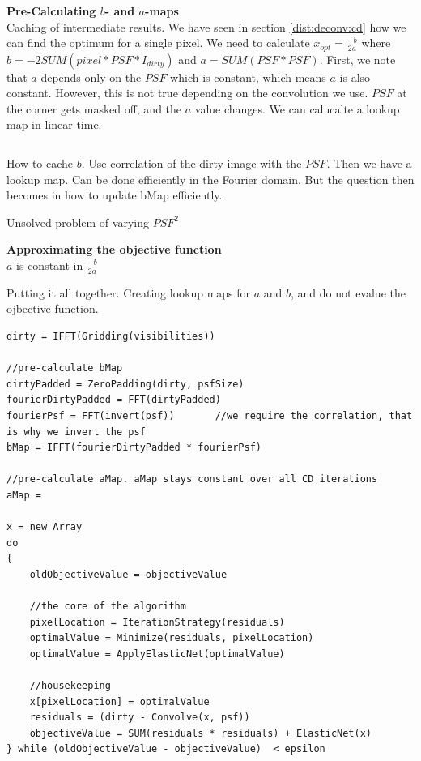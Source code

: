 \textbf{Pre-Calculating $b$- and $a$-maps}\\
Caching of intermediate results. We have seen in section \ref{dist:deconv:cd} how we can find the optimum for a single pixel. We need to calculate  $x_{opt} = \frac{-b}{2a}$ where  $b = -2 SUM( pixel*PSF*I_{dirty})$ and $a = SUM(PSF * PSF)$. First, we note that $a$ depends only on the $PSF$ which is constant, which means $a$ is also constant. However, this is not true depending on the convolution we use.
$PSF$ at the corner gets masked off, and the $a$ value changes.
We can calucalte a lookup map in linear time.
\begin{lstlisting}

\end{lstlisting}

How to cache $b$. Use correlation of the dirty image with the $PSF$. Then we have a lookup map. Can be done efficiently in the Fourier domain. But the question then becomes in how to update bMap efficiently.


Unsolved problem of varying $PSF^2$

\textbf{Approximating the objective function}\\
$a$ is constant in $\frac{-b}{2a}$



Putting it all together. Creating lookup maps for $a$ and $b$, and do not evalue the ojbective function.
\begin{lstlisting}
dirty = IFFT(Gridding(visibilities))

//pre-calculate bMap
dirtyPadded = ZeroPadding(dirty, psfSize)
fourierDirtyPadded = FFT(dirtyPadded)
fourierPsf = FFT(invert(psf))		//we require the correlation, that is why we invert the psf
bMap = IFFT(fourierDirtyPadded * fourierPsf)

//pre-calculate aMap. aMap stays constant over all CD iterations
aMap = 
 
x = new Array   
do 
{
	oldObjectiveValue = objectiveValue
	
	//the core of the algorithm
	pixelLocation = IterationStrategy(residuals)
	optimalValue = Minimize(residuals, pixelLocation)
	optimalValue = ApplyElasticNet(optimalValue)
	
	//housekeeping
	x[pixelLocation] = optimalValue
	residuals = (dirty - Convolve(x, psf))
	objectiveValue = SUM(residuals * residuals) + ElasticNet(x)
} while (oldObjectiveValue - objectiveValue)  < epsilon
\end{lstlisting}



